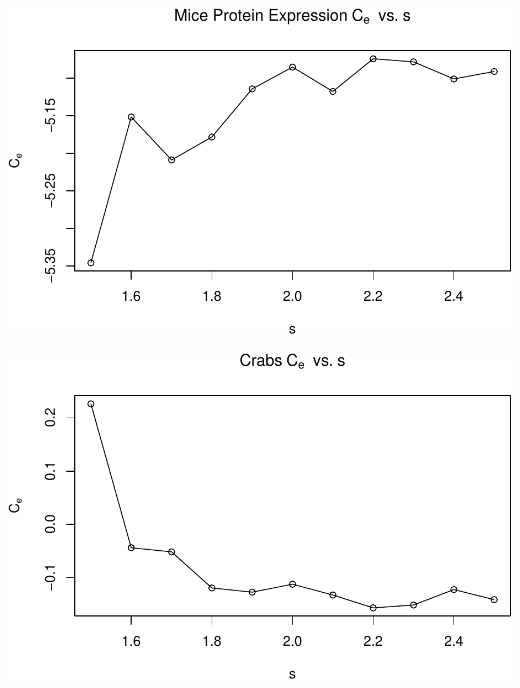 \documentclass[]{article}
\begin{document}
\begin{center}\includegraphics[width=1\linewidth]{Report_files/figure-latex/unnamed-chunk-26-6} \end{center}

\begin{center}\includegraphics[width=1\linewidth]{Report_files/figure-latex/unnamed-chunk-26-7} \end{center}
\end{document}
